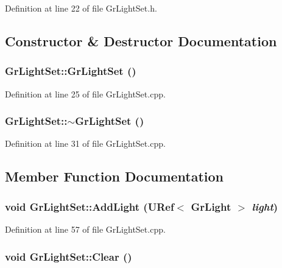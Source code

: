Definition at line 22 of file GrLightSet.h.

\subsection{Constructor \& Destructor Documentation}
\hypertarget{class_gr_light_set_7c0e9bb00cd90e2221fa05bb801cd0f2}{
\subsubsection[{GrLightSet}]{\setlength{\rightskip}{0pt plus 5cm}GrLightSet::GrLightSet ()}}
\label{class_gr_light_set_7c0e9bb00cd90e2221fa05bb801cd0f2}




Definition at line 25 of file GrLightSet.cpp.\hypertarget{class_gr_light_set_7e2ec00f0420faaf3c3e09435fe720dd}{
\subsubsection[{$\sim$GrLightSet}]{\setlength{\rightskip}{0pt plus 5cm}GrLightSet::$\sim$GrLightSet ()}}
\label{class_gr_light_set_7e2ec00f0420faaf3c3e09435fe720dd}




Definition at line 31 of file GrLightSet.cpp.

\subsection{Member Function Documentation}
\hypertarget{class_gr_light_set_79b499c840d066ad287884eed9568e13}{
\subsubsection[{AddLight}]{\setlength{\rightskip}{0pt plus 5cm}void GrLightSet::AddLight ({\bf URef}$<$ {\bf GrLight} $>$ {\em light})}}
\label{class_gr_light_set_79b499c840d066ad287884eed9568e13}




Definition at line 57 of file GrLightSet.cpp.\hypertarget{class_gr_light_set_2a1f2158ae16c06155675d31d2e77e72}{
\subsubsection[{Clear}]{\setlength{\rightskip}{0pt plus 5cm}void GrLightSet::Clear ()}}
\label{class_gr_light_set_2a1f2158ae16c06155675d31d2e77e72}




